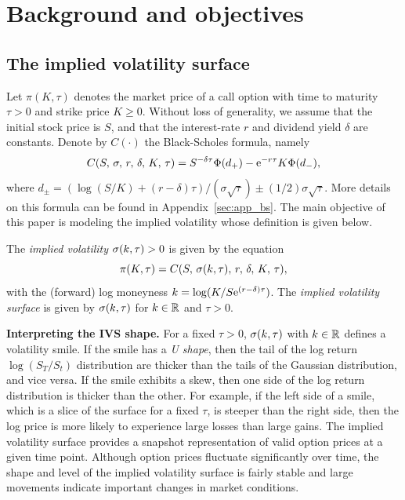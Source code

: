
\section{Background and objectives} \label{sec:ivs}

\subsection{The implied volatility surface}

Let $\pi(K, \tau)$ denotes the market price of a call option with time to maturity $\tau>0$ and strike price $K\ge0$.
Without loss of generality, we assume that the initial stock price is $S$, and that the interest-rate $r$ and dividend yield $\delta$ are constants.
Denote by $C(\cdot)$ the Black-Scholes formula, namely
\begin{equation}\label{eq:BSMcp}
C(S, \, \sigma, \, r, \, \delta, \,K, \, \tau) = S^{-\delta \tau} \Phi(d_+) - {\rm e}^{-r\tau}K \Phi(d_-),
\end{equation}
where 
$
d_\pm = (\log(S/K) + (r-\delta)\tau)/(\sigma \sqrt{\tau}) \pm (1/2)\sigma\sqrt{\tau}.
$
More details on this formula can be found in Appendix~\ref{sec:app_bs}.
The main objective of this paper is modeling the implied volatility whose definition is given below.
\begin{definition}\label{def:ivs}
The \emph{implied volatility} $\sigma(k,\tau)>0$ is given by the equation
\begin{equation} \label{eq:iv_def}
\pi(K,\tau) = C(S, \, \sigma(k, \tau), \, r, \, \delta, \, K, \, \tau),
\end{equation}
with the (forward) log moneyness $k=\log(K/S{\rm e}^{(r-\delta)\tau})$.
The \emph{implied volatility surface} is given by $\sigma(k,\tau)$ for $k\in{\mathbb R}$ and $\tau>0$.
\end{definition}

\textbf{Interpreting the IVS shape.}
For a fixed $\tau>0$,  $\sigma(k,\tau)$ with $k\in{\mathbb R}$ defines a volatility smile.
If the smile has a \emph{U shape}, then the tail of the log return $\log(S_T/S_t)$ distribution are thicker than the tails of the Gaussian distribution, and vice versa.
If the smile exhibits a skew, then one side of the log return distribution is thicker than the other.
For example, if the left side of a smile, which is a slice of the surface for a fixed $\tau$, is steeper than the right side, then the log price is more likely to experience large losses than large gains.
The implied volatility surface provides a snapshot representation of valid option prices at a given time point.
Although option prices fluctuate significantly over time, the shape and level of the implied volatility surface is fairly stable and large movements indicate important changes in market conditions.

